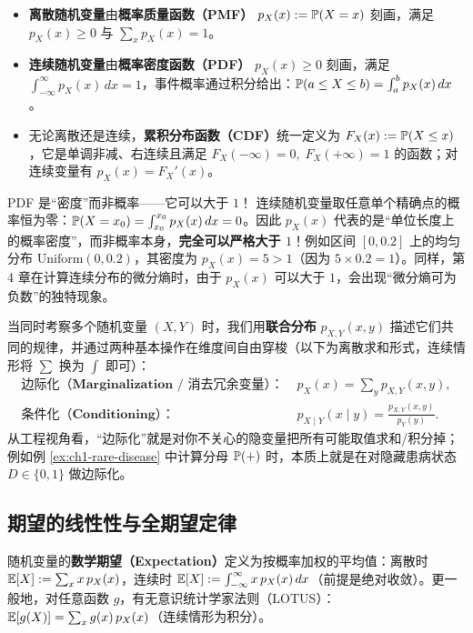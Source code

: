 \begin{itemize}
  \item \textbf{离散随机变量}由\textbf{概率质量函数（PMF）} $p_X(x) := \mathbb{P}(X = x)$ 刻画，满足 $p_X(x) \ge 0$ 与 $\sum_x p_X(x) = 1$。
  \item \textbf{连续随机变量}由\textbf{概率密度函数（PDF）} $p_X(x) \ge 0$ 刻画，满足 $\int_{-\infty}^\infty p_X(x)\,dx = 1$，事件概率通过积分给出：$\mathbb{P}(a \le X \le b) = \int_a^b p_X(x)\,dx$。
  \item 无论离散还是连续，\textbf{累积分布函数（CDF）}统一定义为 $F_X(x) := \mathbb{P}(X \le x)$，它是单调非减、右连续且满足 $F_X(-\infty)=0,\; F_X(+\infty)=1$ 的函数；对连续变量有 $p_X(x) = F_X'(x)$。
\end{itemize}

\begin{failBox}{PDF 是“密度”而非概率——它可以大于 $1$！}
连续随机变量取任意单个精确点的概率恒为零：$\mathbb{P}(X = x_0) = \int_{x_0}^{x_0} p_X(x)\,dx = 0$。因此 $p_X(x)$ 代表的是“单位长度上的概率密度”，而非概率本身，\textbf{完全可以严格大于 $1$}！例如区间 $[0, 0.2]$ 上的均匀分布 $\mathrm{Uniform}(0, 0.2)$，其密度为 $p_X(x) = 5 > 1$（因为 $5 \times 0.2 = 1$）。同样，第 4 章在计算连续分布的微分熵时，由于 $p_X(x)$ 可以大于 $1$，会出现“微分熵可为负数”的独特现象。
\end{failBox}

当同时考察多个随机变量 $(X, Y)$ 时，我们用\textbf{联合分布} $p_{X,Y}(x,y)$ 描述它们共同的规律，并通过两种基本操作在维度间自由穿梭（以下为离散求和形式，连续情形将 $\sum$ 换为 $\int$ 即可）：
\begin{align*}
  \textbf{边际化（Marginalization / 消去冗余变量）：}\; & p_X(x) = \sum_y p_{X,Y}(x, y), \\
  \textbf{条件化（Conditioning）：}\; & p_{X\mid Y}(x \mid y) = \frac{p_{X,Y}(x, y)}{p_Y(y)}.
\end{align*}
从工程视角看，“边际化”就是对你不关心的隐变量把所有可能取值求和/积分掉；例如例 \ref{ex:ch1-rare-disease} 中计算分母 $\mathbb{P}(+)$ 时，本质上就是在对隐藏患病状态 $D \in \{0, 1\}$ 做边际化。

\subsection{期望的线性性与全期望定律}

随机变量的\textbf{数学期望（Expectation）}定义为按概率加权的平均值：离散时 $\mathbb{E}[X] := \sum_x x\,p_X(x)$，连续时 $\mathbb{E}[X] := \int_{-\infty}^\infty x\,p_X(x)\,dx$（前提是绝对收敛）。更一般地，对任意函数 $g$，有无意识统计学家法则（LOTUS）：$\mathbb{E}[g(X)] = \sum_x g(x)\,p_X(x)$（连续情形为积分）。

